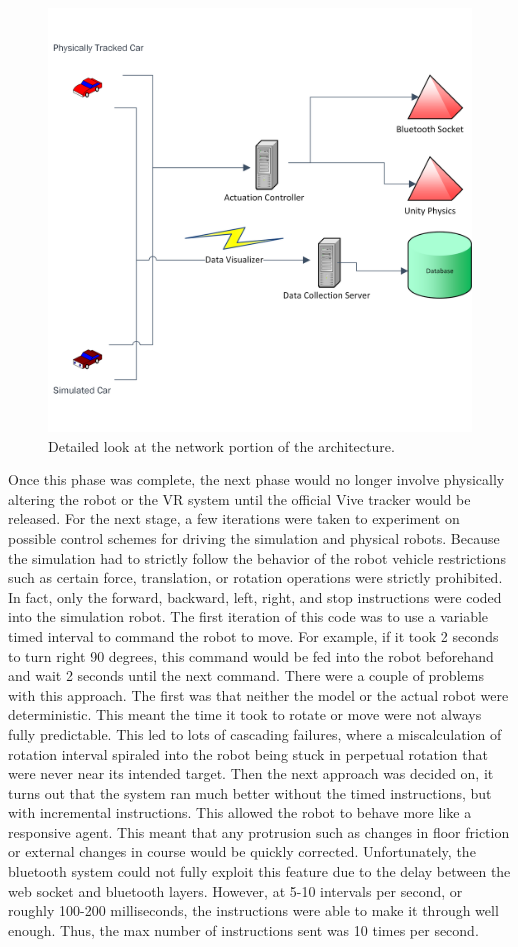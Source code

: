 \documentclass[10pt,a4paper]{article}
\begin{document}
	\begin{figure}
	\centering
	\includegraphics[width=.6\textwidth]{Network_pipline.png}
	\caption{Detailed look at the network portion of the architecture.}
	\label{fig:network-pipe}
	\end{figure}

	Once this phase was complete, the next phase would no longer involve physically altering the robot or the VR system until the official Vive tracker would be released. For the next stage, a few iterations were taken to experiment on possible control schemes for driving the simulation and physical robots. Because the simulation had to strictly follow the behavior of the robot vehicle restrictions such as certain force, translation, or rotation operations were strictly prohibited. In fact, only the forward, backward, left, right, and stop instructions were coded into the simulation robot. The first iteration of this code was to use a variable timed interval to command the robot to move. For example, if it took 2 seconds to turn right 90 degrees, this command would be fed into the robot beforehand and wait 2 seconds until the next command. There were a couple of problems with this approach. The first was that neither the model or the actual robot were deterministic. This meant the time it took to rotate or move were not always fully predictable. This led to lots of cascading failures, where a miscalculation of rotation interval spiraled into the robot being stuck in perpetual rotation that were never near its intended target. Then the next approach was decided on, it turns out that the system ran much better without the timed instructions, but with incremental instructions. This allowed the robot to behave more like a responsive agent. This meant that any protrusion such as changes in floor friction or external changes in course would be quickly corrected. Unfortunately, the bluetooth system could not fully exploit this feature due to the delay between the web socket and bluetooth layers. However, at 5-10 intervals per second, or roughly 100-200 milliseconds, the instructions were able to make it through well enough. Thus, the max number of instructions sent was 10 times per second.
	
\end{document}
